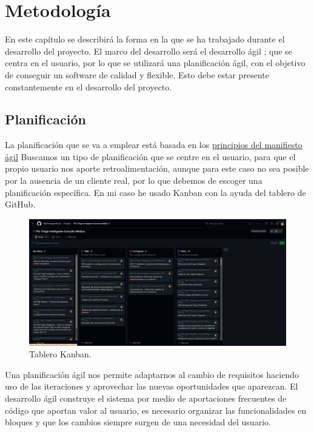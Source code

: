 \UseRawInputEncoding
\chapter{Metodología}
\label{ch:metodología}
En este capítulo se describirá la forma en la que se ha trabajado durante el desarrollo del proyecto.
El marco del desarrollo será el desarrollo ágil \cite{agile-software-development}; que se centra en el usuario, por lo que se utilizará una planificación ágil, con el objetivo
de conseguir un software de calidad y flexible. Esto debe estar presente constantemente en el desarrollo del proyecto.

\section{Planificación}
\label{sc:planificación}
La planificación que se va a emplear está basada en los {\href{https://agilemanifesto.org/iso/es/principles.html}{principios del manifiesto ágil}}
Buscamos un tipo de planificación que se centre en el usuario, para que el propio usuario nos aporte retroalimentación, aunque para este caso no sea posible por la
ausencia de un cliente real, por lo que debemos de escoger una planificación específica. En mi caso he usado Kanban con la ayuda del tablero de GitHub.

\begin{figure}[h]
    \centering
    \includegraphics[width=0.9\linewidth]{logos/kanban.png}
    \caption{Tablero Kanban.}
    \label{fig:layout1}
\end{figure}

Una planificación ágil nos permite adaptarnos al cambio de requisitos haciendo uso de las iteraciones y aprovechar las nuevas oportunidades que aparezcan.
El desarrollo ágil construye el sistema por medio de aportaciones frecuentes de código que aportan valor
al usuario, es necesario organizar las funcionalidades en bloques y que los cambios siempre surgen de una necesidad del usuario.

